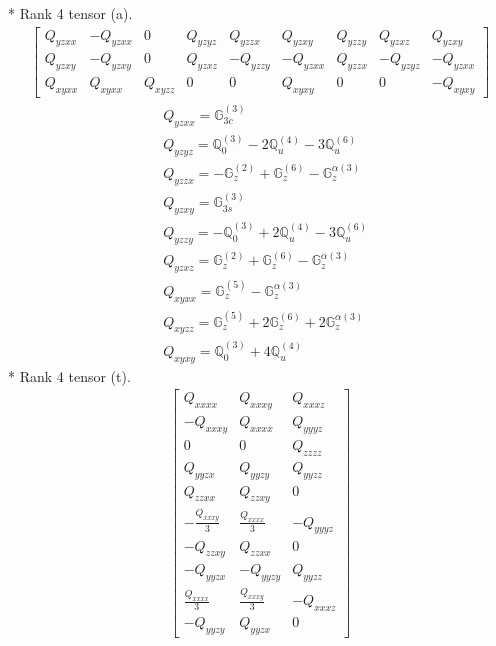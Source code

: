 \documentclass[fleqn,8pt,landscape]{jsarticle}
\begin{document}
* Rank 4 tensor (a).
\begin{align*}
\begin{bmatrix} Q_{yzxx} & - Q_{yzxx} & 0 & Q_{yzyz} & Q_{yzzx} & Q_{yzxy} & Q_{yzzy} & Q_{yzxz} & Q_{yzxy} \\ Q_{yzxy} & - Q_{yzxy} & 0 & Q_{yzxz} & - Q_{yzzy} & - Q_{yzxx} & Q_{yzzx} & - Q_{yzyz} & - Q_{yzxx} \\ Q_{xyxx} & Q_{xyxx} & Q_{xyzz} & 0 & 0 & Q_{xyxy} & 0 & 0 & - Q_{xyxy} \end{bmatrix}
\end{align*}
\begin{align*}
& Q_{yzxx} = \mathbb{G}_{3c}^{(3)} \\
& Q_{yzyz} = \mathbb{Q}_{0}^{(3)} - 2 \mathbb{Q}_{u}^{(4)} - 3 \mathbb{Q}_{u}^{(6)} \\
& Q_{yzzx} = - \mathbb{G}_{z}^{(2)} + \mathbb{G}_{z}^{(6)} - \mathbb{G}_{z}^{\alpha(3)} \\
& Q_{yzxy} = \mathbb{G}_{3s}^{(3)} \\
& Q_{yzzy} = - \mathbb{Q}_{0}^{(3)} + 2 \mathbb{Q}_{u}^{(4)} - 3 \mathbb{Q}_{u}^{(6)} \\
& Q_{yzxz} = \mathbb{G}_{z}^{(2)} + \mathbb{G}_{z}^{(6)} - \mathbb{G}_{z}^{\alpha(3)} \\
& Q_{xyxx} = \mathbb{G}_{z}^{(5)} - \mathbb{G}_{z}^{\alpha(3)} \\
& Q_{xyzz} = \mathbb{G}_{z}^{(5)} + 2 \mathbb{G}_{z}^{(6)} + 2 \mathbb{G}_{z}^{\alpha(3)} \\
& Q_{xyxy} = \mathbb{Q}_{0}^{(3)} + 4 \mathbb{Q}_{u}^{(4)}
\end{align*}
* Rank 4 tensor (t).
\begin{align*}
\begin{bmatrix} Q_{xxxx} & Q_{xxxy} & Q_{xxxz} \\ - Q_{xxxy} & Q_{xxxx} & Q_{yyyz} \\ 0 & 0 & Q_{zzzz} \\ Q_{yyzx} & Q_{yyzy} & Q_{yyzz} \\ Q_{zzxx} & Q_{zzxy} & 0 \\ - \frac{Q_{xxxy}}{3} & \frac{Q_{xxxx}}{3} & - Q_{yyyz} \\ - Q_{zzxy} & Q_{zzxx} & 0 \\ - Q_{yyzx} & - Q_{yyzy} & Q_{yyzz} \\ \frac{Q_{xxxx}}{3} & \frac{Q_{xxxy}}{3} & - Q_{xxxz} \\ - Q_{yyzy} & Q_{yyzx} & 0 \end{bmatrix}
\end{align*}
\end{document}
